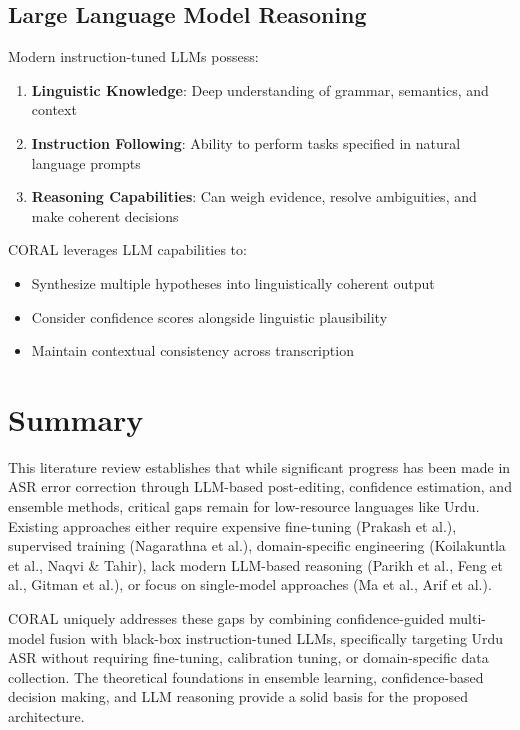 \subsection{Large Language Model Reasoning}

Modern instruction-tuned LLMs possess:

\begin{enumerate}[topsep=6pt,itemsep=3pt]
    \item \textbf{Linguistic Knowledge}: Deep understanding of grammar, semantics, and context
    \item \textbf{Instruction Following}: Ability to perform tasks specified in natural language prompts
    \item \textbf{Reasoning Capabilities}: Can weigh evidence, resolve ambiguities, and make coherent decisions
\end{enumerate}

CORAL leverages LLM capabilities to:
\begin{itemize}[topsep=4pt,itemsep=2pt]
    \item Synthesize multiple hypotheses into linguistically coherent output
    \item Consider confidence scores alongside linguistic plausibility
    \item Maintain contextual consistency across transcription
\end{itemize}

\section{Summary}

This literature review establishes that while significant progress has been made in ASR error correction through LLM-based post-editing, confidence estimation, and ensemble methods, critical gaps remain for low-resource languages like Urdu. Existing approaches either require expensive fine-tuning (Prakash et al.), supervised training (Nagarathna et al.), domain-specific engineering (Koilakuntla et al., Naqvi \& Tahir), lack modern LLM-based reasoning (Parikh et al., Feng et al., Gitman et al.), or focus on single-model approaches (Ma et al., Arif et al.).

CORAL uniquely addresses these gaps by combining confidence-guided multi-model fusion with black-box instruction-tuned LLMs, specifically targeting Urdu ASR without requiring fine-tuning, calibration tuning, or domain-specific data collection. The theoretical foundations in ensemble learning, confidence-based decision making, and LLM reasoning provide a solid basis for the proposed architecture.

